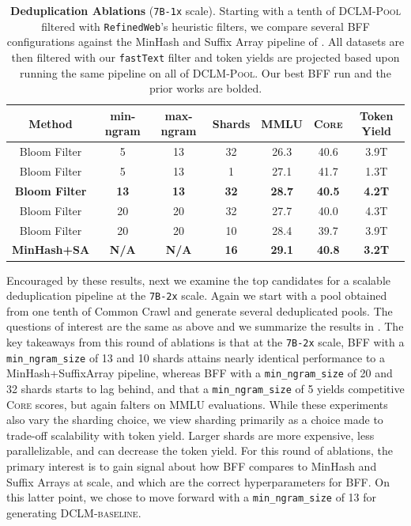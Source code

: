 \documentclass{article}
\newcommand{\rawpool}{\textsc{DCLM-Pool}\xspace}
\newcommand{\hqpool}{\textsc{DCLM-baseline}\xspace}
\newcommand{\ltrack}{\texttt{7B-1x}\xspace}
\newcommand{\xltrack}{\texttt{7B-2x}\xspace}
\newcommand{\rw}{\texttt{RefinedWeb}\xspace}
\newcommand{\fasttext}{\texttt{fastText}\xspace}
\newcommand{\lowvar}{\textsc{Core}\xspace}
\newcommand{\commoncrawl}{Common Crawl\xspace}
\begin{document}
\begin{table}[h]
\centering
%
%
\caption{\textbf{Deduplication Ablations} (\ltrack scale). Starting with a tenth of \rawpool filtered with \rw's heuristic filters, we compare several BFF configurations against the MinHash and Suffix Array pipeline of \citep{Lee2021DeduplicatingTD, refinedweb}. All datasets are then filtered with our \fasttext filter and token yields are projected based upon running the same pipeline on all of \rawpool. Our best BFF run and the prior works are bolded. }
\label{table:dedup-ablations-cx1}
\begin{tabular}{cccc|ccc}
\toprule
Method & min-ngram & max-ngram & Shards & MMLU & \lowvar & Token Yield \\
\midrule
Bloom Filter & 5 & 13 & 32 & 26.3 & 40.6 & 3.9T \\
Bloom Filter & 5 & 13 & 1 & 27.1 & 41.7 & 1.3T \\
\textbf{Bloom Filter} & \textbf{13} & \textbf{13} & \textbf{32} & \textbf{28.7} & \textbf{40.5} & \textbf{4.2T} \\
Bloom Filter & 20 & 20 & 32 & 27.7 & 40.0 & 4.3T \\
Bloom Filter & 20 & 20 & 10 & 28.4 & 39.7 & 3.9T \\
\textbf{MinHash+SA} & \textbf{N/A} & \textbf{N/A} & \textbf{16} & \textbf{29.1} & \textbf{40.8} & \textbf{3.2T}\\\bottomrule
\end{tabular}
%
\end{table}


Encouraged by these results, next we examine the top candidates for a scalable deduplication pipeline at the \xltrack scale. Again we start with a pool obtained from one tenth of \commoncrawl and generate several deduplicated pools. The questions of interest are the same as above and we summarize the results in .
The key takeaways from this round of ablations is that at the \xltrack scale, BFF with a \texttt{min\_ngram\_size} of 13 and 10 shards attains nearly identical performance to a MinHash+SuffixArray pipeline, whereas BFF with a \texttt{min\_ngram\_size} of 20 and 32 shards starts to lag behind, and that a \texttt{min\_ngram\_size} of 5 yields competitive \lowvar scores, but again falters on MMLU evaluations. While these experiments also vary the sharding choice, we view sharding primarily as a choice made to trade-off scalability with token yield. Larger shards are more expensive, less parallelizable, and can decrease the token yield. For this round of ablations, the primary interest is to gain signal about how BFF compares to MinHash and Suffix Arrays at scale, and which are the correct hyperparameters for BFF. On this latter point, we chose to move forward with a \texttt{min\_ngram\_size} of 13 for generating \hqpool.
\end{document}
